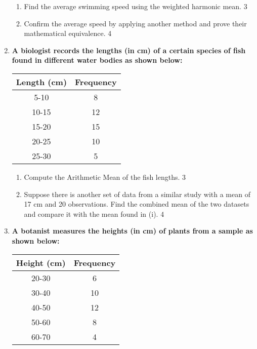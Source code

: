 \documentclass[a4paper,oneside]{book}
\begin{document}
\begin{enumerate}
\begin{enumerate}
    \item  
    Find the average swimming speed using the weighted harmonic mean. \hfill 3
    \item
    Confirm the average speed by applying another method and prove their 
    mathematical equivalence. \hfill 4
\end{enumerate}

\item
\textbf{A biologist records the lengths (in cm) of a certain species of 
fish found in different water bodies as shown below:}

\begin{table}[h]
\centering
\begin{tabular}{c|c}
\textbf{Length (cm)} & \textbf{Frequency} \\ \hline
5-10                 & 8                  \\ \hline
10-15                & 12                 \\ \hline
15-20                & 15                 \\ \hline
20-25                & 10                 \\ \hline
25-30                & 5                  
\end{tabular}
\end{table}

\begin{enumerate}
    \item  
    Compute the Arithmetic Mean of the fish lengths. \hfill 3
    \item
    Suppose there is another set of data from a similar study with a mean of 17 cm and 20 observations. Find the combined mean of the two datasets and compare it with the mean found in (i). \hfill 4
\end{enumerate}

\item
\textbf{A botanist measures the heights (in cm) of plants from a sample as shown below:}

\begin{table}[h]
\centering
\begin{tabular}{c|c}
\textbf{Height (cm)} & \textbf{Frequency} \\ \hline
20-30                & 6                  \\ \hline
30-40                & 10                 \\ \hline
40-50                & 12                 \\ \hline
50-60                & 8                  \\ \hline
60-70                & 4                  
\end{tabular}
\end{table}


\end{enumerate}
\end{document}
